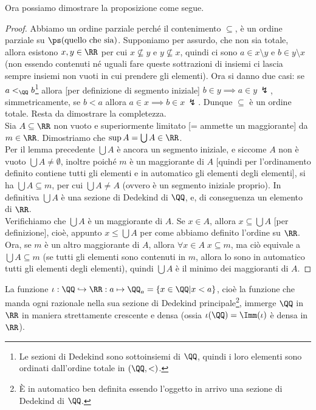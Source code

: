 \documentclass[11pt]{scrartcl}
\begin{document}
Ora possiamo dimostrare la proposizione come segue.

\begin{proof}
	Abbiamo un ordine parziale perché il contenimento $\subseteq$, è un ordine parziale su $\ps(\text{quello che sia})$. Supponiamo per assurdo, che non sia totale, allora esistono $x,y \in \RR$ per cui $x \not\subseteq y$ e 
	$y \not\subseteq x$, quindi ci sono $a \in x \setminus y$ e $b \in y \setminus x$ (non essendo contenuti né uguali fare queste sottrazioni di insiemi ci lascia sempre insiemi non vuoti in cui prendere gli elementi).
	Ora si danno due casi: se $a <_{\QQ} b$\footnote{Le sezioni di Dedekind sono sottoinsiemi di $\QQ$, quindi i loro elementi sono ordinati dall'ordine totale in $(\QQ,<)$.} allora [per definizione di segmento iniziale] $b \in y \implies a \in y \,\lightning$, simmetricamente, se $b < a$ allora $a \in x \implies b \in x \, \lightning$. Dunque $\subseteq$ è un ordine totale.
	Resta da dimostrare la completezza.\\ Sia $A \subseteq \RR$ non vuoto e superiormente limitato [= ammette un maggiorante] da $m \in \RR$. Dimostriamo che $\sup A = \bigcup A \in \RR$.\\
	Per il lemma precedente $\bigcup A$ è ancora un segmento iniziale, e siccome $A$ non è vuoto $\bigcup A \ne \emptyset$, inoltre poiché $m$ è un maggiorante di $A$ [quindi per l'ordinamento definito contiene tutti gli elementi e in automatico gli elementi degli elementi], si ha $\bigcup A \subseteq m$, per cui $\bigcup A \ne A$ (ovvero è un segmento iniziale proprio).
	In definitiva $\bigcup A$ è una sezione di Dedekind di $\QQ$, e, di conseguenza un elemento di $\RR$.\\
	Verifichiamo che $\bigcup A$ è un maggiorante di $A$. Se $x \in A$, allora $x \subseteq \bigcup A$ [per definizione], cioè, appunto $x \leq \bigcup A$ per come abbiamo definito l'ordine su $\RR$.\\
	Ora, se $m$ è un altro maggiorante di $A$, allora $\forall x \in A \; x \subseteq m$, ma ciò equivale a $\bigcup A \subseteq m$ (se tutti gli elementi sono contenuti in $m$, allora lo sono in automatico tutti gli elementi degli elementi), quindi $\bigcup A$ è il minimo dei maggioranti di $A$.
\end{proof}

\begin{remark}
	La funzione $\iota : \QQ \hookrightarrow \RR : a \mapsto \QQ_a = \{x \in \QQ | x < a\}$, cioè la funzione che manda ogni razionale nella sua sezione di Dedekind principale\footnote{È in automatico ben definita essendo l'oggetto in arrivo una sezione di Dedekind di $\QQ$.}, immerge $\QQ$ in $\RR$ in maniera strettamente
	crescente e densa (ossia $\iota(\QQ) = \Imm(\iota)$ è densa in $\RR$).
\end{remark}
\end{document}
